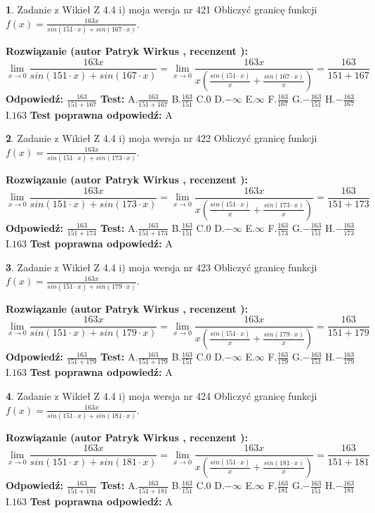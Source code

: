 \documentclass[12pt, a4paper]{article}
\theoremstyle{definition} %
\newtheorem{zad}{}
\newcommand{\zadStart}[1]{\begin{zad}#1\newline}
\newcommand{\zadStop}{\end{zad}}
\newcommand{\rozwStart}[2]{\noindent \textbf{Rozwiązanie (autor #1 , recenzent #2): }\newline}
\newcommand{\rozwStop}{\newline}
\newcommand{\odpStart}{\noindent \textbf{Odpowiedź:}\newline}
\newcommand{\odpStop}{\newline}
\newcommand{\testStart}{\noindent \textbf{Test:}\newline}
\newcommand{\testStop}{\newline}
\newcommand{\kluczStart}{\noindent \textbf{Test poprawna odpowiedź:}\newline}
\newcommand{\kluczStop}{\newline}
\begin{document}
\zadStart{Zadanie z Wikieł Z 4.4 i) moja wersja nr 421}
Obliczyć granicę funkcji $f(x)=\frac{163x}{sin(151\cdot x) +sin(167\cdot x)}$.
\zadStop
\rozwStart{Patryk Wirkus}{}
$$\lim\limits_{x\to 0}\frac{163x}{sin(151\cdot x) +sin(167\cdot x)}=\lim\limits_{x\to 0}\frac{163x}{x(\frac{sin(151\cdot x)}{x}+\frac{sin(167\cdot x)}{x})}=\frac{163}{151+167}$$
\rozwStop
\odpStart
$\frac{163}{151+167}$
\odpStop
\testStart
A.$\frac{163}{151+167}$
B.$\frac{163}{151}$
C.$0$
D.$-\infty$
E.$\infty$
F.$\frac{163}{167}$
G.$-\frac{163}{151}$
H.$-\frac{163}{167}$
I.$163$
\testStop
\kluczStart
A
\kluczStop



\zadStart{Zadanie z Wikieł Z 4.4 i) moja wersja nr 422}
Obliczyć granicę funkcji $f(x)=\frac{163x}{sin(151\cdot x) +sin(173\cdot x)}$.
\zadStop
\rozwStart{Patryk Wirkus}{}
$$\lim\limits_{x\to 0}\frac{163x}{sin(151\cdot x) +sin(173\cdot x)}=\lim\limits_{x\to 0}\frac{163x}{x(\frac{sin(151\cdot x)}{x}+\frac{sin(173\cdot x)}{x})}=\frac{163}{151+173}$$
\rozwStop
\odpStart
$\frac{163}{151+173}$
\odpStop
\testStart
A.$\frac{163}{151+173}$
B.$\frac{163}{151}$
C.$0$
D.$-\infty$
E.$\infty$
F.$\frac{163}{173}$
G.$-\frac{163}{151}$
H.$-\frac{163}{173}$
I.$163$
\testStop
\kluczStart
A
\kluczStop



\zadStart{Zadanie z Wikieł Z 4.4 i) moja wersja nr 423}
Obliczyć granicę funkcji $f(x)=\frac{163x}{sin(151\cdot x) +sin(179\cdot x)}$.
\zadStop
\rozwStart{Patryk Wirkus}{}
$$\lim\limits_{x\to 0}\frac{163x}{sin(151\cdot x) +sin(179\cdot x)}=\lim\limits_{x\to 0}\frac{163x}{x(\frac{sin(151\cdot x)}{x}+\frac{sin(179\cdot x)}{x})}=\frac{163}{151+179}$$
\rozwStop
\odpStart
$\frac{163}{151+179}$
\odpStop
\testStart
A.$\frac{163}{151+179}$
B.$\frac{163}{151}$
C.$0$
D.$-\infty$
E.$\infty$
F.$\frac{163}{179}$
G.$-\frac{163}{151}$
H.$-\frac{163}{179}$
I.$163$
\testStop
\kluczStart
A
\kluczStop



\zadStart{Zadanie z Wikieł Z 4.4 i) moja wersja nr 424}
Obliczyć granicę funkcji $f(x)=\frac{163x}{sin(151\cdot x) +sin(181\cdot x)}$.
\zadStop
\rozwStart{Patryk Wirkus}{}
$$\lim\limits_{x\to 0}\frac{163x}{sin(151\cdot x) +sin(181\cdot x)}=\lim\limits_{x\to 0}\frac{163x}{x(\frac{sin(151\cdot x)}{x}+\frac{sin(181\cdot x)}{x})}=\frac{163}{151+181}$$
\rozwStop
\odpStart
$\frac{163}{151+181}$
\odpStop
\testStart
A.$\frac{163}{151+181}$
B.$\frac{163}{151}$
C.$0$
D.$-\infty$
E.$\infty$
F.$\frac{163}{181}$
G.$-\frac{163}{151}$
H.$-\frac{163}{181}$
I.$163$
\testStop
\kluczStart
A
\kluczStop
\end{document}
